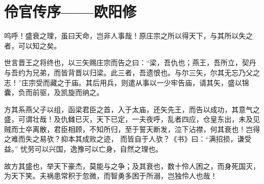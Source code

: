 \section{ 伶官传序——欧阳修}

呜呼！盛衰之理，虽曰天命，岂非人事哉！原庄宗之所以得天下，与其所以失之者，可以知之矣。

世言晋王之将终也，以三矢赐庄宗而告之曰：“梁，吾仇也；燕王，吾所立，契丹与吾约为兄弟，而皆背晋以归梁。此三者，吾遗恨也。与尔三矢，尔其无忘乃父之志！”庄宗受而藏之于庙。其后用兵，则遣从事以一少牢告庙，请其矢，盛以锦囊，负而前驱，及凯旋而纳之。

方其系燕父子以组，函梁君臣之首，入于太庙，还矢先王，而告以成功，其意气之盛，可谓壮哉！及仇雠已灭，天下已定，一夫夜呼，乱者四应，仓皇东出，未及见贼而士卒离散，君臣相顾，不知所归，至于誓天断发，泣下沾襟，何其衰也！岂得之难而失之易欤？抑本其成败之迹， 而皆自于人欤？《书》曰：“满招损，谦受益。” 忧劳可以兴国，逸豫可以亡身，自然之理也。

故方其盛也，举天下豪杰，莫能与之争；及其衰也，数十伶人困之，而身死国灭，为天下笑。夫祸患常积于忽微，而智勇多困于所溺，岂独伶人也哉！


